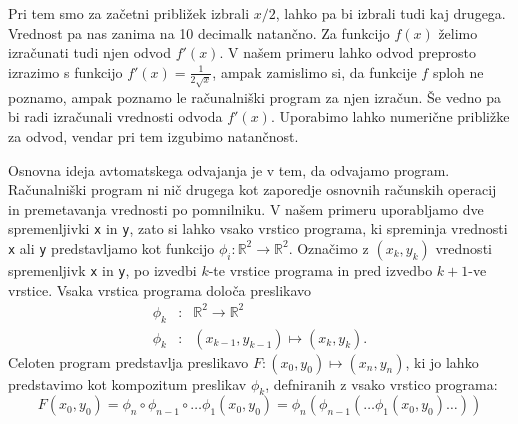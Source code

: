 \documentclass{article}
\newcommand{\RR}{\mathbb{R}}
\begin{document}
Pri tem smo za začetni približek izbrali $x/2$, lahko pa bi izbrali tudi kaj
drugega. Vrednost pa nas zanima na 10 decimalk natančno. 
Za funkcijo $f(x)$ želimo izračunati tudi njen odvod $f'(x)$. V našem
primeru lahko odvod preprosto izrazimo s funkcijo $f'(x)=\frac{1}{2\sqrt{x}}$,
ampak zamislimo si, da funkcije $f$ sploh ne poznamo, ampak poznamo le računalniški program za
njen izračun. Še vedno pa bi radi izračunali vrednosti odvoda $f'(x)$. Uporabimo
lahko numerične približke za odvod, vendar pri tem izgubimo natančnost. 

Osnovna ideja avtomatskega odvajanja je v tem, da odvajamo program. Računalniški program ni nič drugega kot zaporedje osnovnih
računskih operacij in premetavanja vrednosti po pomnilniku. V našem primeru
uporabljamo dve spremenljivki \texttt{x} in \texttt{y}, zato si lahko vsako vrstico
programa, ki spreminja vrednosti \texttt{x} ali \texttt{y} predstavljamo kot
funkcijo $\phi_i:\RR^2\to\RR^2$. Označimo z $(x_k,y_k)$ vrednosti spremenljivk
\texttt{x} in \texttt{y}, po izvedbi $k$-te vrstice programa in pred izvedbo
$k+1$-ve vrstice. Vsaka vrstica programa določa preslikavo
\begin{eqnarray*}
  \phi_k&:&\RR^2\to \RR^2\\
  \phi_k&:&(x_{k-1},y_{k-1})\mapsto (x_k,y_k).
\end{eqnarray*}
Celoten program predstavlja preslikavo $F:(x_0,y_0)\mapsto (x_n,y_n)$, ki jo
lahko predstavimo kot kompozitum preslikav $\phi_k$, defniranih z vsako vrstico programa:
\begin{equation*}
  F(x_0,y_0) = \phi_n\circ\phi_{n-1}\circ \ldots \phi_1(x_0,y_0) = \phi_n(\phi_{n-1}(\ldots \phi_1(x_0,y_0)\ldots))
\end{equation*}
\end{document}
